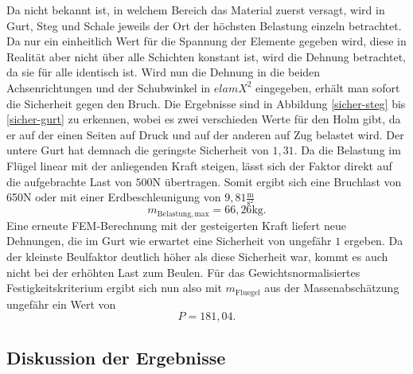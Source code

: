 \noindent Da nicht bekannt ist, in welchem Bereich das Material zuerst versagt, wird in Gurt, Steg und Schale jeweils der Ort der höchsten Belastung einzeln betrachtet. Da nur ein einheitlich Wert für die Spannung der Elemente gegeben wird, diese in Realität aber nicht über alle Schichten konstant ist, wird die Dehnung betrachtet, da sie für alle identisch ist. Wird nun die Dehnung in die beiden Achsenrichtungen und der Schubwinkel in $elamX^{2}$ eingegeben, erhält man sofort die Sicherheit gegen den Bruch. Die Ergebnisse sind in Abbildung \ref{sicher-steg} bis \ref{sicher-gurt} zu erkennen, wobei es zwei verschieden Werte für den Holm gibt, da er auf der einen Seiten auf Druck und auf der anderen auf Zug belastet wird. Der untere Gurt hat demnach die geringste Sicherheit von $1,31$. Da die Belastung im Flügel linear mit der anliegenden Kraft steigen, lässt sich der Faktor direkt auf die aufgebrachte Last von $500\mathrm{N}$ übertragen. Somit ergibt sich eine Bruchlast von 650N oder mit einer Erdbeschleunigung von $9,81\frac{\mathrm{m}}{\mathrm{s^2}}$
$$m_{\mathrm{Belastung,max}} = 66,26\mathrm{kg}. $$ Eine erneute FEM-Berechnung mit der gesteigerten Kraft liefert neue Dehnungen, die im Gurt wie erwartet eine Sicherheit von ungefähr $1$ ergeben. Da der kleinste Beulfaktor deutlich höher als diese Sicherheit war, kommt es auch nicht bei der erhöhten Last zum Beulen.
Für das Gewichtsnormalisiertes Festigkeitskriterium ergibt sich nun also mit $m_{\mathrm{Fluegel}}$ aus der Massenabschätzung ungefähr ein Wert von
$$P = 181,04.$$
\subsection{Diskussion der Ergebnisse}
